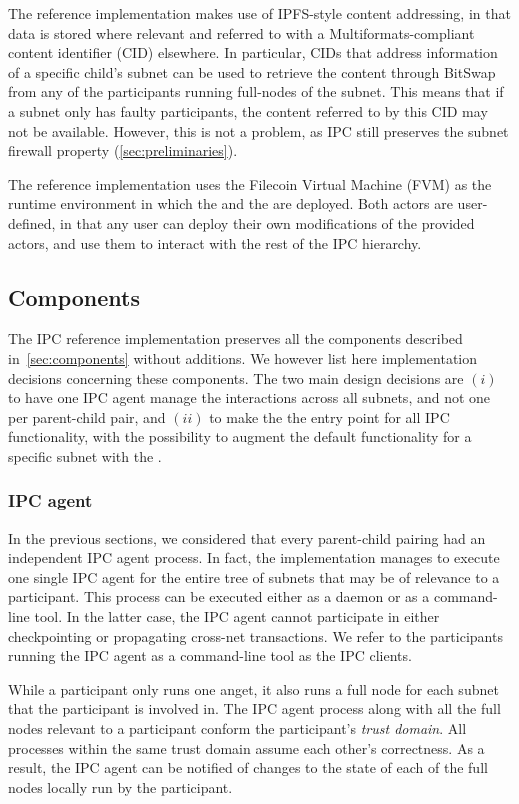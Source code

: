  The reference implementation makes use of IPFS-style content addressing, in that data is stored where relevant and referred to with a Multiformats-compliant~\cite{multiformats} content identifier (CID) elsewhere. In particular, CIDs that address information of a specific child's subnet can be used to retrieve the content through BitSwap~\cite{bitswap} from any of the participants running \glspl{full-node} of the subnet. This means that if a subnet only has faulty participants, the content referred to by this CID may not be available. However, this is not a problem, as IPC still preserves the subnet firewall property (\cref{sec:preliminaries}).

The reference implementation uses the Filecoin Virtual Machine (FVM) as the runtime environment in which the \gw and the \sa are deployed. Both actors are user-defined, in that any user can deploy their own modifications of the provided actors, and use them to interact with the rest of the IPC hierarchy.


\subsection{Components}
The IPC reference implementation preserves all the components described in~\cref{sec:components} without additions. We however list here implementation decisions concerning these components. The two main design decisions are $(i)$ to have one IPC agent manage the interactions across all subnets, and not one per parent-child pair, and $(ii)$ to make the \gw the entry point for all IPC functionality, with the possibility to augment the default functionality for a specific subnet with the \sa.

 \subsubsection{IPC agent} 
 \label{sec:refimplipcagent}
 In the previous sections, we considered that every parent-child pairing had an independent IPC agent process. In fact, the implementation manages to execute one single IPC agent for the entire tree of subnets that may be of relevance to a participant. This process can be executed either as a daemon or as a command-line tool. In the latter case, the IPC agent cannot participate in either checkpointing or propagating cross-net transactions. We refer to the participants running the IPC agent as a command-line tool as the IPC clients.

While a participant only runs one \ipc anget, it also runs a full node for each subnet that the participant is involved in. The IPC agent process along with all the full nodes relevant to a participant conform the participant's \emph{\gls{trust domain}}. All processes within the same trust domain assume each other's correctness.
As a result, the IPC agent can be notified of changes to the state of each of the full nodes locally run by the participant.
